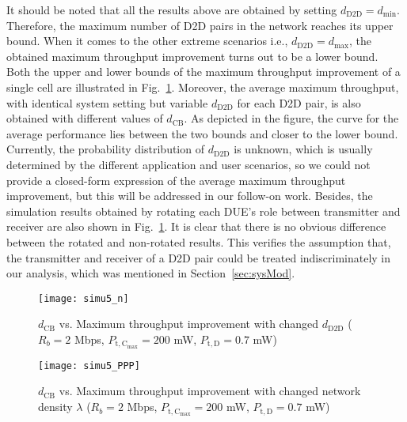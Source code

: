 \documentclass[journal, 10pt]{IEEEtran}
\begin{document}
It should be noted that all the results above are obtained by setting
$d_\mathrm{D2D} = d_{\min}$. Therefore, the maximum number of D2D pairs
in the network reaches its upper bound. When it comes to the other
extreme scenarios i.e., $d_\mathrm{D2D} = d_{\max}$, the obtained
maximum throughput improvement turns out to be a lower bound. Both the
upper and lower bounds of the maximum throughput improvement of a
single cell are illustrated in Fig.~\ref{fig:sim5}. Moreover, the
average maximum throughput, with identical system setting but variable
$d_{\mathrm{D2D}}$ for each D2D pair, is also obtained with different
values of $d_\mathrm{CB}$. As depicted in the figure, the curve for
the average performance lies between the two bounds and closer to the
lower bound. Currently, the probability distribution of
$d_\mathrm{D2D}$ is unknown, which is usually determined by the
different application and user scenarios, so we could not provide a
closed-form expression of the average maximum throughput improvement, but this
will be addressed in our follow-on work. Besides, the 
simulation results obtained by rotating each DUE's role between 
transmitter and receiver are also shown in Fig.~\ref{fig:sim5}. It is 
clear that there is no obvious difference between the rotated and 
non-rotated results. This verifies the assumption that, the transmitter and 
receiver of a D2D pair could be treated indiscriminately in our analysis, 
which was mentioned in Section~\ref{sec:sysMod}.
\begin{figure}[!htb]
\centering \texttt{[image: simu5\_n]} \caption{$d_\mathrm{CB}$ vs. Maximum throughput improvement with changed 
$d_\mathrm{D2D}$ ($R_b = 2$ Mbps, $P_\mathrm{t,C_{max}} = 200$ mW, 
$P_\mathrm{t,D} = 0.7$ mW)}\label{fig:sim5} 
\end{figure}

\begin{figure}[!htb]
\centering \texttt{[image: simu5\_PPP]} \caption{$d_\mathrm{CB}$ vs. Maximum throughput improvement with changed 
network density $\lambda$ ($R_b = 2$ Mbps, $P_\mathrm{t,C_{max}} = 200$ mW, 
$P_\mathrm{t,D} = 0.7$ mW)}\label{fig:sim-ppp}
\end{figure}
\end{document}
